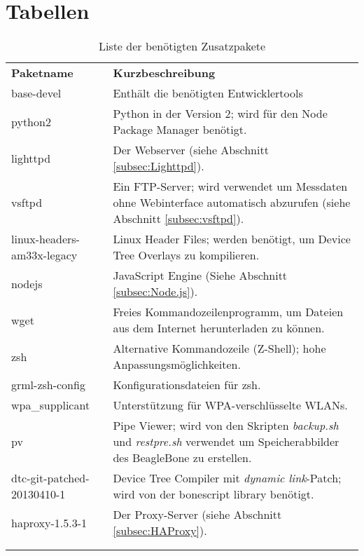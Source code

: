 \chapter{Tabellen}

\begin{longtabu} to \textwidth {
X[1]
X[4]}
\textbf{Paketname} & \textbf{Kurzbeschreibung}\\
base-devel & Enthält die benötigten Entwicklertools\\
python2 & Python in der Version 2; wird für den Node Package Manager benötigt.\\
lighttpd  & Der Webserver (siehe Abschnitt \ref{subsec:Lighttpd}).\\
vsftpd & Ein FTP-Server; wird verwendet um Messdaten ohne Webinterface automatisch abzurufen (siehe Abschnitt \ref{subsec:vsftpd}).\\
linux-headers-am33x-legacy & Linux Header Files; werden benötigt, um Device Tree Overlays zu kompilieren.\\
nodejs & JavaScript Engine (Siehe Abschnitt \ref{subsec:Node.js}).\\
wget & Freies Kommandozeilenprogramm, um Dateien aus dem Internet herunterladen zu können.\\
zsh & Alternative Kommandozeile (Z-Shell); hohe Anpassungsmöglichkeiten.\\
grml-zsh-config & Konfigurationsdateien für zsh.\\
wpa\_supplicant & Unterstützung für WPA-verschlüsselte WLANs.\\
pv & Pipe Viewer; wird von den Skripten \textit{backup.sh} und \textit{restpre.sh} verwendet um Speicherabbilder des BeagleBone zu erstellen.\\
dtc-git-patched-20130410-1 & Device Tree Compiler mit \textit{dynamic link}-Patch; wird von der bonescript library benötigt.\\
haproxy-1.5.3-1 & Der Proxy-Server (siehe Abschnitt \ref{subsec:HAProxy}).\\

\caption{Liste der benötigten Zusatzpakete}\\
\label{tab:additionalPackages}\\
\end{longtabu}
